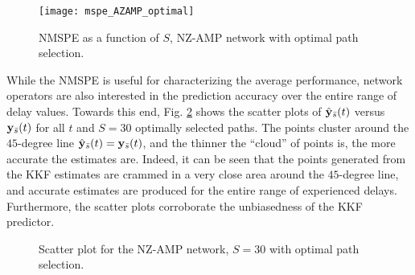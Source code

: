 \documentclass[draftcls,onecolumn,12pt]{IEEEtran}
\newlength \figwidth
\def \ybt {{\b{y}_{\bar{s}}(t)}}
\def \yh {{\hat{\b{y}}_{\bar{s}}}}
\theoremstyle{plain}\newtheorem{thm}{Theorem}
\theoremstyle{definition}
\theoremstyle{remark}
\begin{document}
\begin{figure}
\centering
\texttt{[image: mspe\_AZAMP\_optimal]}
\caption{NMSPE as a function of $S$, NZ-AMP network with optimal path selection.}
\label{mspeNZoptimal}
\end{figure}


While the NMSPE is useful for characterizing the average performance, network operators are also interested in the prediction accuracy over the entire range of delay values.
Towards this end, Fig. \ref{scatternz} shows the scatter plots of $\yh(t)$ versus $\ybt$ for all $t$ and $S = 30$ optimally selected paths.
The points cluster around the $45$-degree line $\yh(t) = \ybt$, and the thinner the ``cloud'' of points is, the more accurate the estimates are. Indeed, it can be seen that the points generated from the KKF estimates are crammed in a very close area around the $45$-degree line, and accurate estimates are produced for the entire range of experienced delays.  Furthermore, the scatter plots corroborate the unbiasedness of the KKF predictor.  


\begin{figure}
	\centering
{}
\caption{Scatter plot for the NZ-AMP network, $S = 30$ with optimal path selection.}
  \label{scatternz}
\end{figure}
\end{document}
